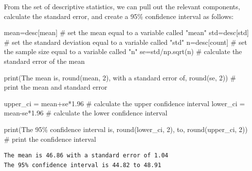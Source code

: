\documentclass[
  letterpaper,
  DIV=11,
  numbers=noendperiod]{scrreprt}
\newenvironment{Shaded}{\begin{snugshade}}{\end{snugshade}}
\newcommand{\BuiltInTok}[1]{\textcolor[rgb]{0.00,0.23,0.31}{#1}}
\newcommand{\CommentTok}[1]{\textcolor[rgb]{0.37,0.37,0.37}{#1}}
\newcommand{\DecValTok}[1]{\textcolor[rgb]{0.68,0.00,0.00}{#1}}
\newcommand{\FloatTok}[1]{\textcolor[rgb]{0.68,0.00,0.00}{#1}}
\newcommand{\NormalTok}[1]{\textcolor[rgb]{0.00,0.23,0.31}{#1}}
\newcommand{\OperatorTok}[1]{\textcolor[rgb]{0.37,0.37,0.37}{#1}}
\newcommand{\SpecialCharTok}[1]{\textcolor[rgb]{0.37,0.37,0.37}{#1}}
\newcommand{\StringTok}[1]{\textcolor[rgb]{0.13,0.47,0.30}{#1}}
\begin{document}
From the set of descriptive statistics, we can pull out the relevant
components, calculate the standard error, and create a 95\% confidence
interval as follows:

\begin{Shaded}
\begin{Highlighting}[]
\NormalTok{mean}\OperatorTok{=}\NormalTok{desc[}\StringTok{\textquotesingle{}mean\textquotesingle{}}\NormalTok{] }\CommentTok{\# set the mean equal to a variable called "mean"}
\NormalTok{std}\OperatorTok{=}\NormalTok{desc[}\StringTok{\textquotesingle{}std\textquotesingle{}}\NormalTok{] }\CommentTok{\# set the standard deviation equal to a variable called "std"}
\NormalTok{n}\OperatorTok{=}\NormalTok{desc[}\StringTok{\textquotesingle{}count\textquotesingle{}}\NormalTok{] }\CommentTok{\# set the sample size equal to a variable called "n"}
\NormalTok{se}\OperatorTok{=}\NormalTok{std}\OperatorTok{/}\NormalTok{np.sqrt(n) }\CommentTok{\# calculate the standard error of the mean}

\BuiltInTok{print}\NormalTok{(}\StringTok{\textquotesingle{}The mean is\textquotesingle{}}\NormalTok{, }\BuiltInTok{round}\NormalTok{(mean, }\DecValTok{2}\NormalTok{), }\StringTok{\textquotesingle{}with a standard error of\textquotesingle{}}\NormalTok{, }\BuiltInTok{round}\NormalTok{(se, }\DecValTok{2}\NormalTok{)) }\CommentTok{\# print the mean and standard error}

\NormalTok{upper\_ci }\OperatorTok{=}\NormalTok{ mean}\OperatorTok{+}\NormalTok{se}\OperatorTok{*}\FloatTok{1.96} \CommentTok{\# calculate the upper confidence interval}
\NormalTok{lower\_ci }\OperatorTok{=}\NormalTok{ mean}\OperatorTok{{-}}\NormalTok{se}\OperatorTok{*}\FloatTok{1.96} \CommentTok{\# calculate the lower confidence interval}

\BuiltInTok{print}\NormalTok{(}\StringTok{\textquotesingle{}The 95}\SpecialCharTok{\% c}\StringTok{onfidence interval is\textquotesingle{}}\NormalTok{, }\BuiltInTok{round}\NormalTok{(lower\_ci, }\DecValTok{2}\NormalTok{), }\StringTok{\textquotesingle{}to\textquotesingle{}}\NormalTok{, }\BuiltInTok{round}\NormalTok{(upper\_ci, }\DecValTok{2}\NormalTok{)) }\CommentTok{\# print the confidence interval}
\end{Highlighting}
\end{Shaded}

\begin{verbatim}
The mean is 46.86 with a standard error of 1.04
The 95% confidence interval is 44.82 to 48.91
\end{verbatim}
\end{document}
